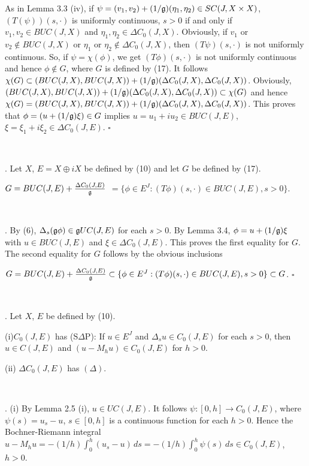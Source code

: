 \documentclass[10pt,onside,reqno]{amsart}
\theoremstyle{remark}
\theoremstyle{definition}
\begin{document}
 \noindent As in Lemma 3.3 (iv), if $\psi= (v_1,v_2)+ (1/\frak{g})(\eta_1,\eta_2)\in SC(J,X\times X) $,  $(T(\psi))(s,\cdot)$ is uniformly continuous, $s > 0$ if and only if
$v_1,v_2 \in BUC(J,X) $ and $\eta_1,\eta_2\in  \Delta C_0 (J,X)$. Obviously, if  $v_1$ or $v_2\not \in BUC(J,X) $ or $\eta_1$ or $\eta_2\not\in  \Delta C_0 (J,X)$, then $(T\psi)(s,\cdot)$ is not uniformly continuous. So, if $\psi= \chi(\phi)$, we get   $(T\phi) (s,\cdot)$ is not uniformly continuous and hence $\phi \not \in G$, where  $G$ is defined by (17). It follows $\chi (G)\subset (BUC(J,X),
BUC(J,X))+ (1/\frak{g})(\Delta C_0(J,X),\Delta C_0(J,X)) $. Obviously,
 $ (BUC(J,X),
BUC(J,X))+ (1/\frak{g})(\Delta C_0(J,X),\Delta C_0(J,X)) \subset \chi(G)$ and hence $\chi (G)= (BUC(J,X),
BUC(J,X))+ (1/\frak{g})(\Delta C_0(J,X),\Delta C_0(J,X)) $. This proves that
 $\phi= (u+ (1/\frak{g})\xi) \in G$
 implies $u=u_1+i u_2 \in BUC(J,E) $, $\xi=\xi_1+i\xi_2\in  \Delta C_0 (J,E)$.
$\square$


\

.  Let  $X$, $E= X\oplus i X$ be  defined by (10) and let $G$ be defined by (17).

$G=BUC (J,E) + \frac{\Delta C_0 (J,E)}{\frak{g}}$
 $ = \{\phi\in E^J
: (T\phi) (s,\cdot)\in BUC(J,E), s > 0\}$.

\


. By (6), $\Delta_s (\frak{g}\phi)\in \frak{g} UC(J,E) $ for each $ s > 0$. By Lemma 3.4, $\phi= u+ (1/\frak{g})\xi $ with $u\in BUC(J,E)$ and  $\xi \in \Delta C_0 (J,E
)$. This proves the first equality for $G$.
  The second  equality for $G$   follows by the obvious inclusions

   $ G= BUC (J,E) + \frac{\Delta C_0 (J,E)}{\frak{g}}\subset  \{\phi\in E^J
: (T\phi) (s,\cdot)\in BUC(J,E), s > 0\}\subset G $.
  $\square$


\

. Let  $X$, $E$ be  defined by (10).

(i)$ C_0(J,E)$ has (S$\Delta$P): If  $u\in E^J$ and $\Delta_s u \in C_0(J,E)$ for each $s > 0$, then $u\in C(J,E)$ and $(u-M_h u)\in C_0(J,E)$ for $h > 0$.


(ii) $\Delta C_0(J,E)$ has $(\Delta)$.

\

. (i) By Lemma 2.5 (i),  $u\in UC(J,E)$.
 It follows $\psi: [0,h]\to C_0 (J,E)$, where $\psi (s)= u_s-u$, $s \in [0,h]$ is a continuous function for each $h >0$. Hence the Bochner-Riemann integral  $u-M_h u= -(1/h)\int_0^h (u_s-u)\, ds =  -(1/h)\int_0^h \psi (s)\, ds\in C_0(J,E)$, $h >0$.
\end{document}
